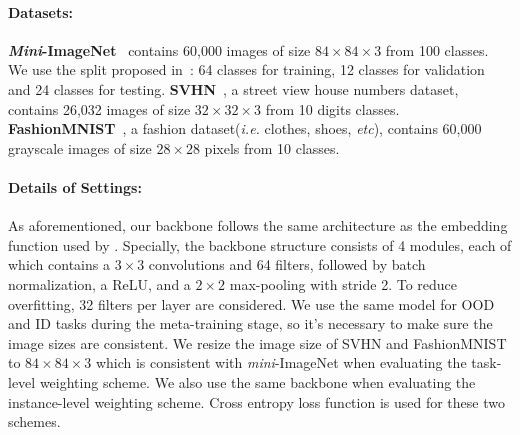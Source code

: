\paragraph{Datasets: }\textbf{\textit{Mini}-ImageNet}~\citep{ravi2016optimization} contains 60,000 images of size $84\times84\times3$ from 100 classes. We use the split proposed in~\cite{ravi2016optimization}: 64 classes for training, 12 classes for validation and 24 classes for testing. \textbf{SVHN}~\citep{netzer2011reading}, a street view house numbers dataset, contains 26,032 images of  size $32\times32\times3$ from 10 digits classes. \textbf{FashionMNIST}~\citep{xiao2017fashion}, a fashion dataset(\textit{i.e.} clothes, shoes, \textit{etc}), contains 60,000 grayscale images of size $28\times28$ pixels from 10 classes.



\paragraph{Details of Settings: } As aforementioned, our backbone follows the same architecture as the embedding function used by \citep{finn2017model}. Specially, the backbone structure consists of 4 modules, each of which contains a $3\times3$ convolutions and 64 filters, followed by batch normalization, a ReLU, and a $2\times2$ max-pooling with stride 2. To reduce overfitting, 32 filters per layer are considered. We use the same model for OOD and ID tasks during the meta-training stage, so it's necessary to make sure the image sizes are consistent. We resize the image size of SVHN and FashionMNIST to $84\times84\times3$ which is consistent with \textit{mini}-ImageNet when evaluating the task-level weighting scheme. We also use the same backbone when evaluating the instance-level weighting scheme. Cross entropy loss function is used for these two schemes. 


